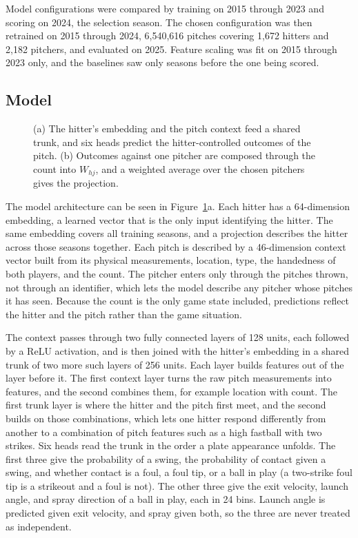 Model configurations were compared by training on 2015 through 2023 and scoring on 2024, the selection season. The chosen configuration was then retrained on 2015 through 2024, 6,540,616 pitches covering 1,672 hitters and 2,182 pitchers, and evaluated on 2025. Feature scaling was fit on 2015 through 2023 only, and the baselines saw only seasons before the one being scored.

\subsection{Model}
\label{sec:model}

\begin{figure}[!ht]
\centering

\caption{\toreview (a) The hitter's embedding and the pitch context feed a shared trunk, and six heads predict the hitter-controlled outcomes of the pitch. (b) Outcomes against one pitcher are composed through the count into $W_{hj}$, and a weighted average over the chosen pitchers gives the projection.}
\label{fig:arch}
\end{figure}

The model architecture can be seen in Figure~\ref{fig:arch}a. Each hitter has a 64-dimension embedding, a learned vector that is the only input identifying the hitter. The same embedding covers all training seasons, and a projection describes the hitter across those seasons together. Each pitch is described by a 46-dimension context vector built from its physical measurements, location, type, the handedness of both players, and the count. The pitcher enters only through the pitches thrown, not through an identifier, which lets the model describe any pitcher whose pitches it has seen. Because the count is the only game state included, predictions reflect the hitter and the pitch rather than the game situation.

The context passes through two fully connected layers of 128 units, each followed by a ReLU activation, and is then joined with the hitter's embedding in a shared trunk of two more such layers of 256 units. Each layer builds features out of the layer before it. The first context layer turns the raw pitch measurements into features, and the second combines them, for example location with count. The first trunk layer is where the hitter and the pitch first meet, and the second builds on those combinations, which lets one hitter respond differently from another to a combination of pitch features such as a high fastball with two strikes. Six heads read the trunk in the order a plate appearance unfolds. The first three give the probability of a swing, the probability of contact given a swing, and whether contact is a foul, a foul tip, or a ball in play (a two-strike foul tip is a strikeout and a foul is not). The other three give the exit velocity, launch angle, and spray direction of a ball in play, each in 24 bins. Launch angle is predicted given exit velocity, and spray given both, so the three are never treated as independent.

